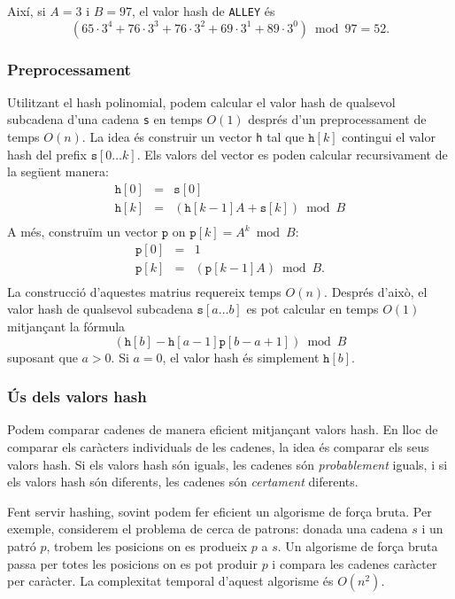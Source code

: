 Així, si $A=3$ i $B=97$, el valor hash de \texttt{ALLEY} és
\[(65 \cdot 3^4 + 76 \cdot 3^3 + 76 \cdot 3^2 + 69 \cdot 3^1 + 89 \cdot 3^0) \bmod 97 = 52.\]


\subsubsection*{Preprocessament}

Utilitzant el hash polinomial, podem calcular el valor hash de
qualsevol subcadena d'una cadena \texttt{s} en temps $O(1)$ després
d'un preprocessament de temps $O(n)$. La idea és construir un vector
\texttt{h} tal que $\texttt{h}[k]$ contingui el valor hash del prefix
$\texttt{s}[0 \ldots k]$. Els valors del vector es poden calcular
recursivament de la següent manera:
\[
\begin{array}{lcl}
\texttt{h}[0] & = & \texttt{s}[0] \\
\texttt{h}[k] & = & (\texttt{h}[k-1] A + \texttt{s}[k]) \bmod B \\
\end{array}
\]
A més, construïm un vector $\texttt{p}$ on $\texttt{p}[k]=A^k \bmod B$:
\[
\begin{array}{lcl}
\texttt{p}[0] & = & 1 \\
\texttt{p}[k] & = & (\texttt{p}[k-1] A) \bmod B. \\
\end{array}
\]
La construcció d'aquestes matrius requereix temps $O(n)$. Després
d'això, el valor hash de qualsevol subcadena $\texttt{s}[a \ldots b]$
es pot calcular en temps $O(1)$ mitjançant la fórmula
\[(\texttt{h}[b]-\texttt{h}[a-1] \texttt{p}[b-a+1]) \bmod B\]
suposant que $a>0$. Si $a=0$, el valor hash és simplement $\texttt{h}[b]$.

\subsubsection*{Ús dels valors hash}

Podem comparar cadenes de manera eficient mitjançant valors hash. En
lloc de comparar els caràcters individuals de les cadenes, la idea és
comparar els seus valors hash. Si els valors hash són iguals, les
cadenes són \emph{probablement} iguals, i si els valors hash són
diferents, les cadenes són \emph{certament} diferents.

Fent servir hashing, sovint podem fer eficient un algorisme de força
bruta. Per exemple, considerem el problema de cerca de patrons: donada
una cadena $s$ i un patró $p$, trobem les posicions on es produeix $p$
a $s$. Un algorisme de força bruta passa per totes les posicions on es
pot produir $p$ i compara les cadenes caràcter per caràcter. La
complexitat temporal d'aquest algorisme és $O(n^2)$.

